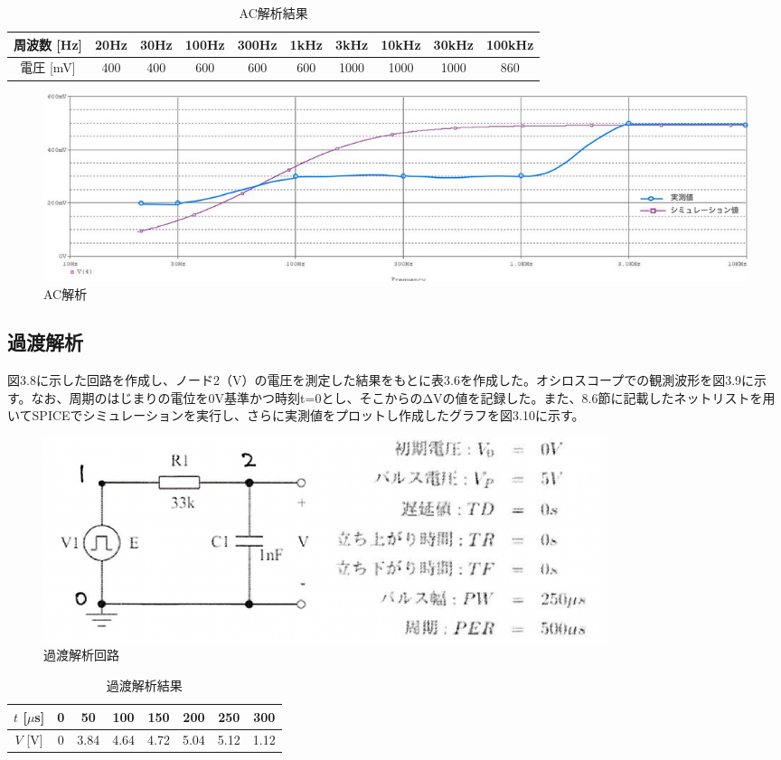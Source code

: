 \documentclass{jlreq}
\numberwithin{equation}{section}
\begin{document}
\begin{table}[H]
  \centering
    \caption{AC解析結果}
    \begin{tabular}{|c|c|c|c|c|c|c|c|c|c|}
      \hline
      周波数 [Hz] & 20Hz & 30Hz & 100Hz & 300Hz & 1kHz & 3kHz & 10kHz & 30kHz & 100kHz \\ \hline
      電圧 [mV] & 400 & 400 & 600 & 600 & 600 & 1000 & 1000 & 1000 & 860 \\ \hline
    \end{tabular}
\end{table}

\begin{figure}[H]
  \centering
  \includegraphics[width=\textwidth]{assets/ackaisekiplot.jpg}
  \caption{AC解析}
\end{figure}

\subsection{過渡解析}
図3.8に示した回路を作成し、ノード2（V）の電圧を測定した結果をもとに表3.6を作成した。オシロスコープでの観測波形を図3.9に示す。なお、周期のはじまりの電位を0V基準かつ時刻t=0とし、そこからのΔVの値を記録した。また、8.6節に記載したネットリストを用いてSPICEでシミュレーションを実行し、さらに実測値をプロットし作成したグラフを図3.10に示す。

\begin{figure}[H]
  \centering
  \includegraphics[width=0.8\textwidth]{assets/katokaisekikairo.png}
  \caption{過渡解析回路}
\end{figure}

\begin{table}[H]
  \centering
  \caption{過渡解析結果}
  \begin{tabular}{|c|c|c|c|c|c|c|c|}
    \hline
    \( t \) [\(\mu\)s] & 0 & 50 & 100 & 150 & 200 & 250 & 300 \\ \hline
    \( V \) [V] & 0 & 3.84 & 4.64 & 4.72 & 5.04 & 5.12 & 1.12 \\ \hline
  \end{tabular}
\end{table}
\end{document}
